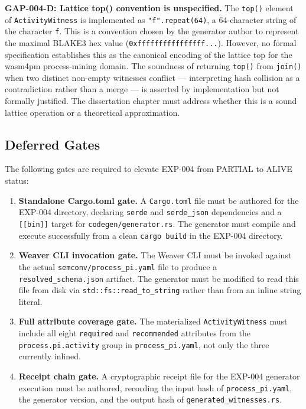 \textbf{GAP-004-D: Lattice top() convention is unspecified.} The \texttt{top()} element
of \texttt{ActivityWitness} is implemented as \texttt{"f".repeat(64)}, a 64-character
string of the character \texttt{f}. This is a convention chosen by the generator author
to represent the maximal BLAKE3 hex value (\texttt{0xffffffffffffffff...}). However, no
formal specification establishes this as the canonical encoding of the lattice top for
the wasm4pm process-mining domain. The soundness of returning \texttt{top()} from
\texttt{join()} when two distinct non-empty witnesses conflict --- interpreting hash
collision as a contradiction rather than a merge --- is asserted by implementation but
not formally justified. The dissertation chapter must address whether this is a sound
lattice operation or a theoretical approximation.

\subsection{Deferred Gates}
\label{sec:otel-weaver-exp-004-registry-to-witness-deferred-gates}

The following gates are required to elevate EXP-004 from PARTIAL to ALIVE status:

\begin{enumerate}
  \item \textbf{Standalone Cargo.toml gate.} A \texttt{Cargo.toml} file must be authored
    for the EXP-004 directory, declaring \texttt{serde} and \texttt{serde\_json}
    dependencies and a \texttt{[[bin]]} target for \texttt{codegen/generator.rs}. The
    generator must compile and execute successfully from a clean \texttt{cargo build} in
    the EXP-004 directory.
  \item \textbf{Weaver CLI invocation gate.} The Weaver CLI must be invoked against the
    actual \texttt{semconv/process\_pi.yaml} file to produce a \texttt{resolved\_schema.json}
    artifact. The generator must be modified to read this file from disk via
    \texttt{std::fs::read\_to\_string} rather than from an inline string literal.
  \item \textbf{Full attribute coverage gate.} The materialized \texttt{ActivityWitness}
    must include all eight \texttt{required} and \texttt{recommended} attributes from the
    \texttt{process.pi.activity} group in \texttt{process\_pi.yaml}, not only the three
    currently inlined.
  \item \textbf{Receipt chain gate.} A cryptographic receipt file for the EXP-004
    generator execution must be authored, recording the input hash of
    \texttt{process\_pi.yaml}, the generator version, and the output hash of
    \texttt{generated\_witnesses.rs}.
\end{enumerate}

